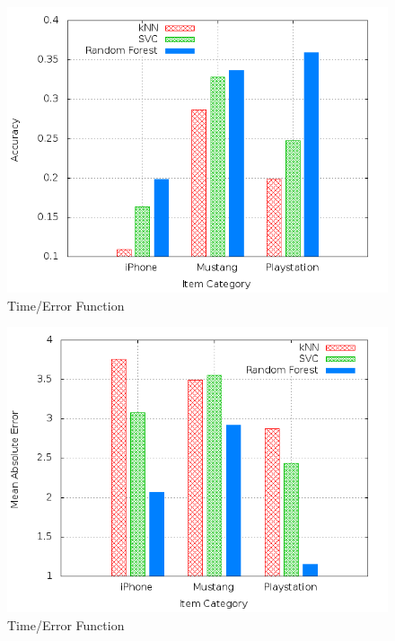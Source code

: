 \begin{figure}
\centering
\includegraphics[scale=0.55]{images/plots/machine_learning/plot_price_classification_acc.png}
\caption{Time/Error Function}
\label{crowdsourcing_desc_length}
\end{figure}
\begin{figure}
\centering
\includegraphics[scale=0.55]{images/plots/machine_learning/plot_price_classification_mae.png}
\caption{Time/Error Function}
\label{crowdsourcing_desc_length}
\end{figure}

